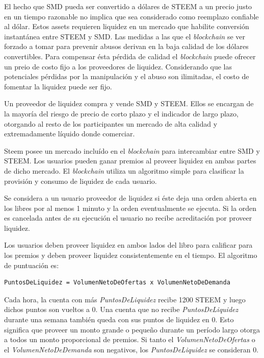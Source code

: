 \documentclass[a4paper,titlepage,final]{article}
\begin{document}
El hecho que SMD pueda ser convertido a dólares de STEEM a un precio justo en un tiempo razonable no implica que sea considerado como reemplazo confiable al dólar. Estos assets requieren liquidez en un mercado que habilite conversión instantánea entre STEEM y SMD. Las medidas a las que el \textit{blockchain} se ver forzado a tomar para prevenir abusos derivan en la baja calidad de los dólares convertibles. Para compensar ésta pérdida de calidad el \textit{blockchain} puede ofrecer un preio de costo fijo a los proveedores de liquidez. Considerando que las potenciales pérdidas por la manipulación y el abuso son ilimitadas, el costo de fomentar la liquidez puede ser fijo.

Un proveedor de liquidez compra y vende SMD y STEEM. Ellos se encargan de la mayoría del riesgo de precio de corto plazo y el indicador de largo plazo, otorgando al resto de los participantes un mercado de alta calidad y extremadamente líquido donde comerciar.

Steem posee un mercado incluído en el \textit{blockchain} para intercambiar entre SMD y STEEM. Los usuarios pueden ganar premios al proveer liquidez en ambas partes de dicho mercado. El \textit{blockchain} utiliza un algoritmo simple para clasificar la provisión y consumo de liquidez de cada usuario.

Se considera a un usuario proveedor de liquidez si éste deja una orden abierta en los libres por al menos 1 minuto y la orden eventualmente se ejecuta. Si la orden es cancelada antes de su ejecución el usuario no recibe acreditación por proveer liquidez.

Los usuarios deben proveer liquidez en ambos lados del libro para calificar para los premios y deben proveer liquidez consistentemente en el tiempo. El algoritmo de puntuación es:

\begin{lstlisting}[frame=single]
PuntosDeLiquidez = VolumenNetoDeOfertas x VolumenNetoDeDemanda
\end{lstlisting}

Cada hora, la cuenta con más \textit{PuntosDeLiquidez} recibe 1200 STEEM y luego dichos puntos son vueltos a 0. Una cuenta que no recibe \textit{PuntosDeLiquidez} durante una semana también queda con sus puntos de liquidez en 0. Esto significa que proveer un monto grande o pequeño durante un período largo otorga a todos un monto proporcional de premios. Si tanto el \textit{VolumenNetoDeOfertas} o el \textit{VolumenNetoDeDemanda} son negativos, los \textit{PuntosDeLiquidez} se consideran 0.
\end{document}

